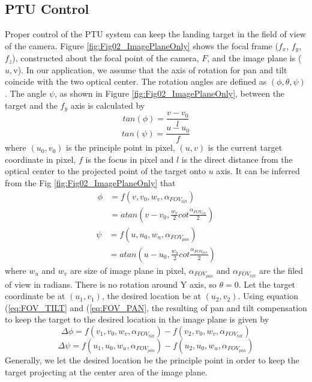 \documentclass[journal,article,submit,moreauthors,pdftex,10pt,a4paper]{mdpi}
\begin{document}
\subsection{PTU Control}

Proper control of the PTU system can keep the landing target in the field of view of the camera. Figure \ref{fig:Fig02_ImagePlaneOnly} shows the focal frame ($f_x$, $f_y$, $f_z$), constructed about the focal point of the camera, $F$, and the image plane is ($u, $v).  In our application, we assume that the axis of rotation for pan and tilt coincide with the two optical center. The rotation angles are defined as $(\phi, \theta, \psi)$. The angle $\psi$, as shown in Figure  \ref{fig:Fig02_ImagePlaneOnly}, between the target and the $f_y$ axis is calculated by
\begin{equation}
	tan(\phi)=\frac{v-v_0}{l}
\end{equation}
\begin{equation}
	tan(\psi)=\frac{u-u_0}{f}
\end{equation}
where $(u_0, v_0)$ is the principle point in pixel, $(u, v)$ is the current target coordinate in pixel, $f$ is the focus in pixel and $l$ is the direct distance from the optical center to the projected point of the target onto $u$ axis. It can be inferred from the Fig \ref{fig:Fig02_ImagePlaneOnly} that
\begin{align} \label{eq:FOV_TILT}
	\phi &=f(v, v_0, w_v, \alpha_{FOV_{tilt}}) \\
	&=atan(v-v_0, \frac{w_v}{2}cot \frac{\alpha_{FOV_{tilt}}}{2})
\end{align}
\begin{align} \label{eq:FOV_PAN}
	\psi &=f(u, u_0, w_u, \alpha_{FOV_{pan}}) \\
	&=atan(u-u_0, \frac{w_u}{2}cot\frac{\alpha_{FOV_{pan}}}{2})
\end{align}
where $w_u$ and $w_v$ are size of image plane in pixel, $\alpha_{FOV_{pan}}$ and $\alpha_{FOV_{tilt}}$ are the filed of view in radians. There is no rotation around Y axis, so $\theta = 0$. Let the target coordinate be at $(u_1, v_1)$, the desired location be at $(u_2, v_2)$. Using equation (\ref{eq:FOV_TILT} and (\ref{eq:FOV_PAN}, the resulting of pan and tilt compensation to keep the target to the desired location in the image plane is given by
\begin{equation}
	\Delta\phi=f(v_1,v_0,w_v, \alpha_{FOV_{tilt}})-f(v_2,v_0, w_v, \alpha_{FOV_{tilt}})
\end{equation}
\begin{equation}
	\Delta\psi=f(u_1,u_0,w_u, \alpha_{FOV_{pan}})-f(u_2,u_0, w_u, \alpha_{FOV_{pan}})
\end{equation}
Generally, we let the desired location be the principle point in order to keep the target projecting at the center area of the image plane.
\end{document}
